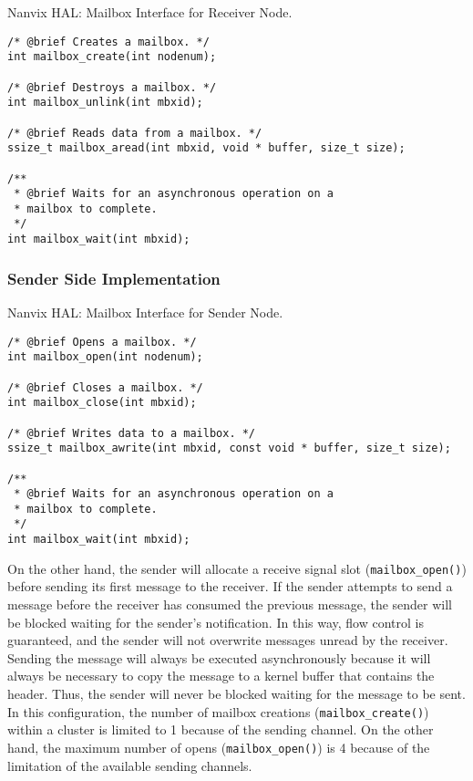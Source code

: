 \begin{listing}[!tb]
\caption{Nanvix HAL: Mailbox Interface for Receiver Node.}
\label{code:hal-mailbox-receiver}
\begin{verbatim}
/* @brief Creates a mailbox. */
int mailbox_create(int nodenum);

/* @brief Destroys a mailbox. */
int mailbox_unlink(int mbxid);

/* @brief Reads data from a mailbox. */
ssize_t mailbox_aread(int mbxid, void * buffer, size_t size);

/**
 * @brief Waits for an asynchronous operation on a
 * mailbox to complete.
 */
int mailbox_wait(int mbxid);
\end{verbatim}
\end{listing}

			\subsubsection{Sender Side Implementation}

\begin{listing}[!tb]
\caption{Nanvix HAL: Mailbox Interface for Sender Node.}
\label{code:hal-mailbox-sender}
\begin{verbatim}
/* @brief Opens a mailbox. */
int mailbox_open(int nodenum);

/* @brief Closes a mailbox. */
int mailbox_close(int mbxid);

/* @brief Writes data to a mailbox. */
ssize_t mailbox_awrite(int mbxid, const void * buffer, size_t size);

/**
 * @brief Waits for an asynchronous operation on a
 * mailbox to complete.
 */
int mailbox_wait(int mbxid);
\end{verbatim}
\end{listing}

				On the other hand, the sender will allocate a receive signal slot (\texttt{mailbox\_open()})
				before sending its first message to the receiver.
				If the sender attempts to send a message before the receiver has consumed
				the previous message, the sender will be blocked waiting for the sender's notification.
				In this way, flow control is guaranteed, and the sender will not overwrite
				messages unread by the receiver.
				Sending the message will always be executed asynchronously
				because it will always be necessary to copy the message to
				a kernel buffer that contains the header.
				Thus, the sender will never be blocked waiting for the message to be sent.
				In this configuration, the number of mailbox creations (\texttt{mailbox\_create()})
				within a cluster is limited to 1 because of the \cnoc sending channel.
				On the other hand, the maximum number of opens (\texttt{mailbox\_open()}) is
				4 because of the limitation of the available \dnoc sending channels.

